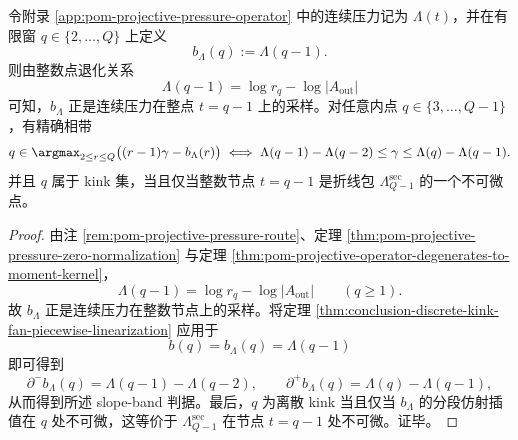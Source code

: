 \begin{theorem}\label{thm:conclusion-discrete-q-fan-exposed-fan-of-pressure-secant}
令附录 \ref{app:pom-projective-pressure-operator} 中的连续压力记为 \(\Lambda(t)\)，并在有限窗 \(q\in\{2,\dots,Q\}\) 上定义
\[
b_\Lambda(q):=\Lambda(q-1).
\]
则由整数点退化关系
\[
\Lambda(q-1)=\log r_q-\log|A_{\mathrm{out}}|
\]
可知，\(b_\Lambda\) 正是连续压力在整点 \(t=q-1\) 上的采样。对任意内点 \(q\in\{3,\dots,Q-1\}\)，有精确相带
\[
q\in \argmax_{2\le r\le Q}\bigl((r-1)\gamma-b_\Lambda(r)\bigr)
\iff
\Lambda(q-1)-\Lambda(q-2)\le \gamma\le \Lambda(q)-\Lambda(q-1).
\]
并且 \(q\) 属于 kink 集，当且仅当整数节点 \(t=q-1\) 是折线包 \(\Lambda_{Q-1}^{\mathrm{sec}}\) 的一个不可微点。
\end{theorem}
\begin{proof}
由注 \ref{rem:pom-projective-pressure-route}、定理 \ref{thm:pom-projective-pressure-zero-normalization} 与定理 \ref{thm:pom-projective-operator-degenerates-to-moment-kernel}，
\[
\Lambda(q-1)=\log r_q-\log|A_{\mathrm{out}}|
\qquad(q\ge 1).
\]
故 \(b_\Lambda\) 正是连续压力在整数节点上的采样。将定理 \ref{thm:conclusion-discrete-kink-fan-piecewise-linearization} 应用于
\[
b(q)=b_\Lambda(q)=\Lambda(q-1)
\]
即可得到
\[
\partial^- b_\Lambda(q)=\Lambda(q-1)-\Lambda(q-2),
\qquad
\partial^+ b_\Lambda(q)=\Lambda(q)-\Lambda(q-1),
\]
从而得到所述 slope-band 判据。最后，\(q\) 为离散 kink 当且仅当 \(b_\Lambda\) 的分段仿射插值在 \(q\) 处不可微，这等价于 \(\Lambda_{Q-1}^{\mathrm{sec}}\) 在节点 \(t=q-1\) 处不可微。证毕。
\end{proof}

